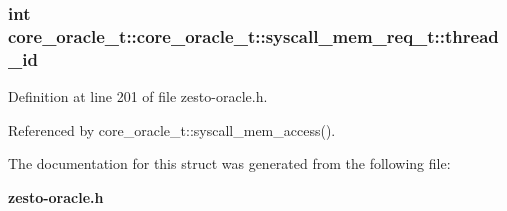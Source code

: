 \subsubsection[{thread\_\-id}]{\setlength{\rightskip}{0pt plus 5cm}int core\_\-oracle\_\-t::core\_\-oracle\_\-t::syscall\_\-mem\_\-req\_\-t::thread\_\-id}\label{structcore__oracle__t_1_1syscall__mem__req__t_9544e5f91f355559225644a61ba800a8}




Definition at line 201 of file zesto-oracle.h.

Referenced by core\_\-oracle\_\-t::syscall\_\-mem\_\-access().

The documentation for this struct was generated from the following file:\begin{CompactItemize}
\item 
{\bf zesto-oracle.h}\end{CompactItemize}
